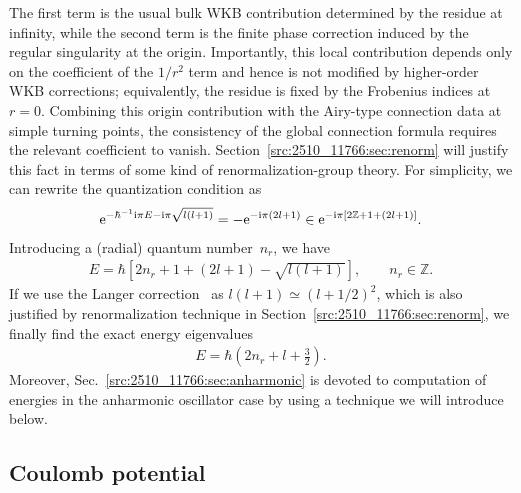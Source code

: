 The first term is the usual bulk WKB contribution determined by the residue at infinity, while the second term is the
finite phase correction induced by the regular singularity at the origin.
Importantly, this local contribution depends only on the coefficient of the \(1/r^{2}\) term and hence is not modified by
higher-order WKB corrections; equivalently, the residue is fixed by the Frobenius indices at $r=0$.
Combining this origin contribution with the Airy-type connection data at simple turning points, the consistency of the
global connection formula requires the relevant coefficient to vanish.
Section~\ref{src:2510_11766:sec:renorm} will justify this fact in terms of some kind of renormalization-group theory.
For simplicity, we can rewrite the quantization condition as
\begin{align}
    \mathrm{e}^{- \hbar^{-1} \mathrm{i} \pi E - \mathrm{i} \pi \sqrt{l(l+1)}}
    = - \mathrm{e}^{-\mathrm{i}\pi(2l+1)}
    \in \mathrm{e}^{-\mathrm{i}\pi[2\mathbb{Z} + 1 + (2l+1)]} .
\end{align}
Introducing a (radial) quantum number~$n_r$, we have
\begin{align}
    E = \hbar\left[2n_r + 1 + \left(2l+1\right) - \sqrt{l(l+1)}\right],
    \qquad n_r\in\mathbb{Z}.
\end{align}
If we use the Langer correction~\cite{Langer:PhysRev.51.669} as $l(l+1)\simeq(l+1/2)^2$, which is also justified by renormalization technique in Section~\ref{src:2510_11766:sec:renorm}, we finally find the exact energy eigenvalues
\begin{align}
    E = \hbar\left(2n_r + l + \frac{3}{2}\right) .
\end{align}
Moreover, Sec.~\ref{src:2510_11766:sec:anharmonic} is devoted to computation of energies in the anharmonic oscillator case by using a technique we will introduce below.
\subsection{Coulomb potential}\label{src:2510_11766:sec:coulomb}
